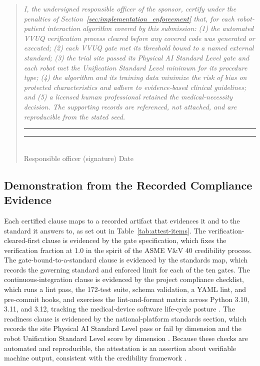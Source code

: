 \begin{quote}
\small\itshape
I, the undersigned responsible officer of the sponsor, certify under the
penalties of Section~\ref{sec:implementation_enforcement} that, for each
robot-patient interaction algorithm covered by this submission: (1) the automated
VVUQ verification process cleared before any covered code was generated or
executed; (2) each VVUQ gate met its threshold bound to a named external
standard; (3) the trial site passed its Physical AI Standard Level gate and each
robot met the Unification Standard Level minimum for its procedure type; (4) the
algorithm and its training data minimize the risk of bias on protected
characteristics and adhere to evidence-based clinical guidelines; and (5) a
licensed human professional retained the medical-necessity decision. The
supporting records are referenced, not attached, and are reproducible from the
stated seed.\par
\medskip
\upshape\rule{6cm}{0.4pt}\quad\rule{3.2cm}{0.4pt}\\
\small Responsible officer (signature)\hspace{1.4cm} Date
\end{quote}

\subsection{Demonstration from the Recorded Compliance Evidence}

Each certified clause maps to a recorded artifact that evidences it and to the
standard it answers to, as set out in Table~\ref{tab:attest-items}. The
verification-cleared-first clause is evidenced by the gate specification, which
fixes the verification fraction at 1.0 in the spirit of the ASME V\&V 40
credibility process. The gate-bound-to-a-standard clause is evidenced by the
standards map, which records the governing standard and enforced limit for each
of the ten gates. The continuous-integration clause is evidenced by the project
compliance checklist, which runs a lint pass, the 172-test suite, schema
validation, a YAML lint, and pre-commit hooks, and exercises the lint-and-format
matrix across Python 3.10, 3.11, and 3.12, tracking the medical-device software
life-cycle posture \cite{iec62304}. The readiness clause is evidenced by the
national-platform standards section, which records the site Physical AI Standard
Level pass or fail by dimension and the robot Unification Standard Level score by
dimension \cite{kawchak2026national}. Because these checks are automated and
reproducible, the attestation is an assertion about verifiable machine output,
consistent with the credibility framework \cite{fda2023credibility,
kawchak2026vvuq02}.

